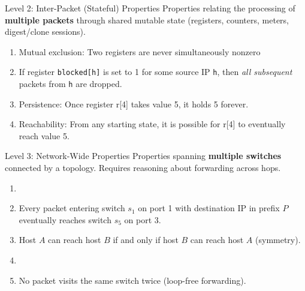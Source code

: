 \documentclass[aspectratio=169]{beamer}
\begin{document}
\begin{hidden}
\begin{frame}{Level 2: Inter-Packet (Stateful) Properties}
\small
Properties relating the processing of \textbf{multiple packets} through shared mutable state
(registers, counters, meters, digest/clone sessions).

\medskip
\begin{enumerate}

\item Mutual exclusion: Two registers are never simultaneously nonzero
  \item If register \texttt{blocked[h]} is set to 1 for some source IP \texttt{h}, then \emph{all subsequent} packets from \texttt{h} are dropped.

  \item Persistence: Once register r[4] takes value 5, it holds 5 forever.

   \item Reachability: From any starting state, it is possible for r[4] to eventually reach value 5.

\end{enumerate}
\end{frame}
\end{hidden}


\begin{hidden}
\begin{frame}{Level 3: Network-Wide Properties}
\small
Properties spanning \textbf{multiple switches} connected by a topology.
Requires reasoning about forwarding across hops.

\medskip
\begin{enumerate}

  \item[\textbf{Reachability}]
  \item Every packet entering switch $s_1$ on port 1 with destination IP in prefix $P$ eventually reaches switch $s_5$ on port 3.
  \item Host $A$ can reach host $B$ if and only if host $B$ can reach host $A$ (symmetry).

  \item[\textbf{Loop freedom}]
  \item No packet visits the same switch twice (loop-free forwarding).

\end{enumerate}
\end{frame}
\end{hidden}
\end{document}
